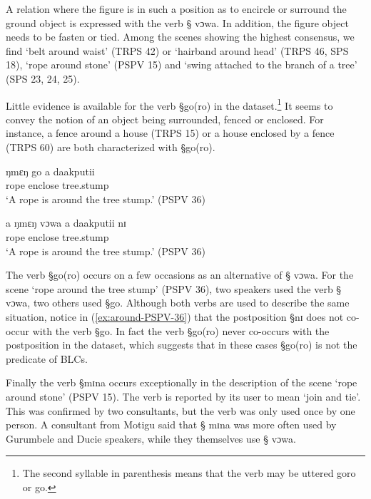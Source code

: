 A relation where the figure is in such a position
as to encircle or surround the ground object is expressed with  the verb {\S
vɔwa}.  In addition, the figure object needs to be fasten or tied. Among
the scenes showing the highest consensus, we find  `belt around waist' (TRPS 42)
or `hairband around head' (TRPS 46, SPS 18),   `rope around stone' (PSPV 15) and
`swing attached to the branch of a tree' (SPS 23, 24, 25). 

Little evidence is available for  the verb
{\S go(ro)} in the dataset.\footnote{The second syllable in parenthesis
means that the verb may be uttered {\F goro} or {\F go}. }  It seems to convey
the notion of an object being surrounded, fenced or enclosed. For instance, a
fence around a house (TRPS 15) or a house enclosed by a fence (TRPS 60) are
both characterized with {\S go(ro)}. 

\begin{exe}
\ex\label{ex:around-PSPV-36}
 \begin{xlist}
  \ex\label{ex:around-PSPV-36-go}
\gll ŋmɛŋ go a daakputii\\
rope enclose {\art} tree.stump\\
\glt `A rope is around the tree stump.' (PSPV 36)

 \ex\label{ex:around-PSPV-36-vowa}
\gll  a ŋmɛŋ vɔwa a daakputii nɪ\\
{\art}  rope enclose {\art}   tree.stump   {\postp}\\
\glt `A rope is around the tree stump.' (PSPV 36)
 \end{xlist}
\end{exe}

The verb  {\S go(ro)} occurs on a few occasions as an alternative of {\S
vɔwa}. For the scene  `rope around the tree stump'  (PSPV 36), two speakers
 used the verb {\S
vɔwa}, two others used {\S go}.  Although both verbs are used to describe the
same situation, notice in  (\ref{ex:around-PSPV-36})  that the postposition
{\S nɪ} does not co-occur with the verb {\S go}. In fact the verb  {\S go(ro)}
never co-occurs with the postposition in the dataset, which suggests that in
these cases {\S go(ro)} is not
the predicate of  BLCs. 

Finally the verb {\S mɪna} occurs exceptionally in the description of the scene 
`rope around stone' (PSPV 15). The verb is reported  by its user
to mean `join and tie'. This was confirmed by two consultants,  but the verb
was only used once by one person. A consultant from Motigu said that {\S
mɪna} was more often used by Gurumbele and Ducie speakers, while they
themselves use {\S
vɔwa}.




